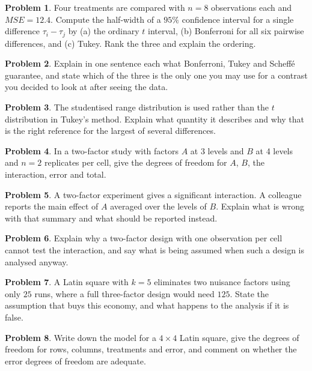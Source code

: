\documentclass[11pt,a4paper]{article}
\theoremstyle{definition}
\newtheorem{problemx}{Problem}[section]
\newenvironment{problem}{\begin{problemx}}{\end{problemx}}
\begin{document}
\begin{problem}
Four treatments are compared with $n=8$ observations each and $MSE=12.4$.
Compute the half-width of a $95\%$ confidence interval for a single difference
$\tau_i-\tau_j$ by (a) the ordinary $t$ interval, (b) Bonferroni for all six
pairwise differences, and (c) Tukey. Rank the three and explain the ordering.
\end{problem}

\begin{problem}
Explain in one sentence each what Bonferroni, Tukey and Scheff\'e guarantee,
and state which of the three is the only one you may use for a contrast you
decided to look at after seeing the data.
\end{problem}

\begin{problem}
The studentised range distribution is used rather than the $t$ distribution in
Tukey's method. Explain what quantity it describes and why that is the right
reference for the largest of several differences.
\end{problem}

\begin{problem}
In a two-factor study with factors $A$ at 3 levels and $B$ at 4 levels and
$n=2$ replicates per cell, give the degrees of freedom for $A$, $B$, the
interaction, error and total.
\end{problem}

\begin{problem}
A two-factor experiment gives a significant interaction. A colleague reports
the main effect of $A$ averaged over the levels of $B$. Explain what is wrong
with that summary and what should be reported instead.
\end{problem}

\begin{problem}
Explain why a two-factor design with one observation per cell cannot test the
interaction, and say what is being assumed when such a design is analysed
anyway.
\end{problem}

\begin{problem}
A Latin square with $k=5$ eliminates two nuisance factors using only $25$
runs, where a full three-factor design would need $125$. State the assumption
that buys this economy, and what happens to the analysis if it is false.
\end{problem}

\begin{problem}
Write down the model for a $4\times4$ Latin square, give the degrees of
freedom for rows, columns, treatments and error, and comment on whether the
error degrees of freedom are adequate.
\end{problem}
\end{document}
